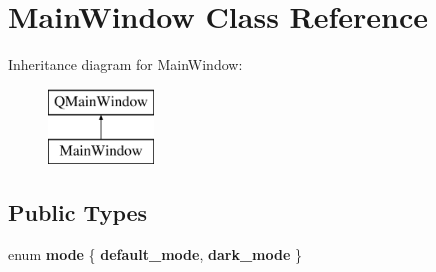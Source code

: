 \hypertarget{class_main_window}{}\section{Main\+Window Class Reference}
\label{class_main_window}
Inheritance diagram for Main\+Window\+:\begin{figure}[H]
\begin{center}
\leavevmode
\includegraphics[height=2.000000cm]{class_main_window}
\end{center}
\end{figure}
\subsection*{Public Types}
\begin{DoxyCompactItemize}
\item 
\mbox{\label{class_main_window_a084c1dc594e504659ff9e10c7f870bd2}} 
enum {\bfseries mode} \{ {\bfseries default\+\_\+mode}, 
{\bfseries dark\+\_\+mode}
 \}
\end{DoxyCompactItemize}
